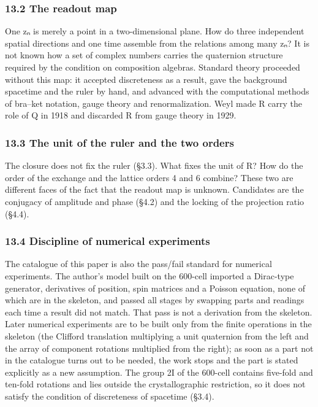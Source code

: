 \documentclass[
  a4paper,
]{article}
\newcounter{none} %
\begin{document}
\subsubsection{13.2 The readout map}\label{the-readout-map}

One zₙ is merely a point in a two-dimensional plane. How do three
independent spatial directions and one time assemble from the relations
among many zₙ? It is not known how a set of complex numbers carries the
quaternion structure required by the condition on composition algebras.
Standard theory proceeded without this map: it accepted discreteness as
a result, gave the background spacetime and the ruler by hand, and
advanced with the computational methods of bra--ket notation, gauge
theory and renormalization. Weyl made R carry the role of Q in 1918 and
discarded R from gauge theory in 1929.

\subsubsection{13.3 The unit of the ruler and the two
orders}\label{the-unit-of-the-ruler-and-the-two-orders}

The closure does not fix the ruler (§3.3). What fixes the unit of R? How
do the order of the exchange and the lattice orders 4 and 6 combine?
These two are different faces of the fact that the readout map is
unknown. Candidates are the conjugacy of amplitude and phase (§4.2) and
the locking of the projection ratio (§4.4).

\subsubsection{13.4 Discipline of numerical
experiments}\label{discipline-of-numerical-experiments}

The catalogue of this paper is also the pass/fail standard for numerical
experiments. The author's model built on the 600-cell imported a
Dirac-type generator, derivatives of position, spin matrices and a
Poisson equation, none of which are in the skeleton, and passed all
stages by swapping parts and readings each time a result did not match.
That pass is not a derivation from the skeleton. Later numerical
experiments are to be built only from the finite operations in the
skeleton (the Clifford translation multiplying a unit quaternion from
the left and the array of component rotations multiplied from the
right); as soon as a part not in the catalogue turns out to be needed,
the work stops and the part is stated explicitly as a new assumption.
The group 2I of the 600-cell contains five-fold and ten-fold rotations
and lies outside the crystallographic restriction, so it does not
satisfy the condition of discreteness of spacetime (§3.4).
\end{document}
